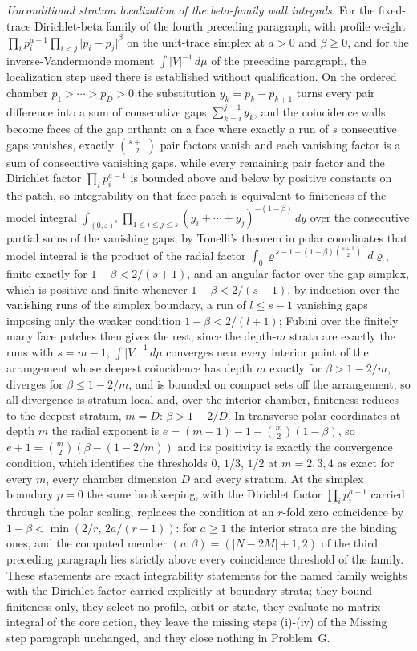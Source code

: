 \emph{Unconditional stratum localization of the beta-family wall integrals.} For the fixed-trace Dirichlet-beta family of the fourth preceding paragraph, with profile weight \(\prod_{i}p_{i}^{a-1}\prod_{i<j}\lvert p_{i}-p_{j}\rvert^{\beta}\) on the unit-trace simplex at \(a>0\) and \(\beta\ge0\), and for the inverse-Vandermonde moment \(\int\lvert V\rvert^{-1}\,d\mu\) of the preceding paragraph, the localization step used there is established without qualification. On the ordered chamber \(p_{1}>\cdots>p_{D}>0\) the substitution \(y_{k}=p_{k}-p_{k+1}\) turns every pair difference into a sum of consecutive gaps \(\sum_{k=i}^{j-1}y_{k}\), and the coincidence walls become faces of the gap orthant: on a face where exactly a run of \(s\) consecutive gaps vanishes, exactly \(\binom{s+1}{2}\) pair factors vanish and each vanishing factor is a sum of consecutive vanishing gaps, while every remaining pair factor and the Dirichlet factor \(\prod_{i}p_{i}^{a-1}\) is bounded above and below by positive constants on the patch, so integrability on that face patch is equivalent to finiteness of the model integral \(\int_{(0,\varepsilon)^{s}}\prod_{1\le i\le j\le s}(y_{i}+\cdots+y_{j})^{-(1-\beta)}\,dy\) over the consecutive partial sums of the vanishing gaps; by Tonelli's theorem in polar coordinates that model integral is the product of the radial factor \(\int_{0}\varrho^{\,s-1-(1-\beta)\binom{s+1}{2}}\,d\varrho\), finite exactly for \(1-\beta<2/(s+1)\), and an angular factor over the gap simplex, which is positive and finite whenever \(1-\beta<2/(s+1)\), by induction over the vanishing runs of the simplex boundary, a run of \(l\le s-1\) vanishing gaps imposing only the weaker condition \(1-\beta<2/(l+1)\); Fubini over the finitely many face patches then gives the rest; since the depth-\(m\) strata are exactly the runs with \(s=m-1\), \(\int\lvert V\rvert^{-1}\,d\mu\) converges near every interior point of the arrangement whose deepest coincidence has depth \(m\) exactly for \(\beta>1-2/m\), diverges for \(\beta\le1-2/m\), and is bounded on compact sets off the arrangement, so all divergence is stratum-local and, over the interior chamber, finiteness reduces to the deepest stratum, \(m=D\): \(\beta>1-2/D\). In transverse polar coordinates at depth \(m\) the radial exponent is \(e=(m-1)-1-\binom{m}{2}(1-\beta)\), so \(e+1=\binom{m}{2}(\beta-(1-2/m))\) and its positivity is exactly the convergence condition, which identifies the thresholds \(0\), \(1/3\), \(1/2\) at \(m=2,3,4\) as exact for every \(m\), every chamber dimension \(D\) and every stratum. At the simplex boundary \(p=0\) the same bookkeeping, with the Dirichlet factor \(\prod_{i}p_{i}^{a-1}\) carried through the polar scaling, replaces the condition at an \(r\)-fold zero coincidence by \(1-\beta<\min(2/r,\,2a/(r-1))\): for \(a\ge1\) the interior strata are the binding ones, and the computed member \((a,\beta)=(\lvert N-2M\rvert+1,2)\) of the third preceding paragraph lies strictly above every coincidence threshold of the family. These statements are exact integrability statements for the named family weights with the Dirichlet factor carried explicitly at boundary strata; they bound finiteness only, they select no profile, orbit or state, they evaluate no matrix integral of the core action, they leave the missing steps (i)-(iv) of the Missing step paragraph unchanged, and they close nothing in Problem~G.

